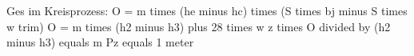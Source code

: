 Ges im Kreisprozess:  
O = m times (he minus hc) times (S times bj minus S times w trim)  
O = m times (h2 minus h3) plus 28 times w  
z times O divided by (h2 minus h3) equals m  
Pz equals 1 meter